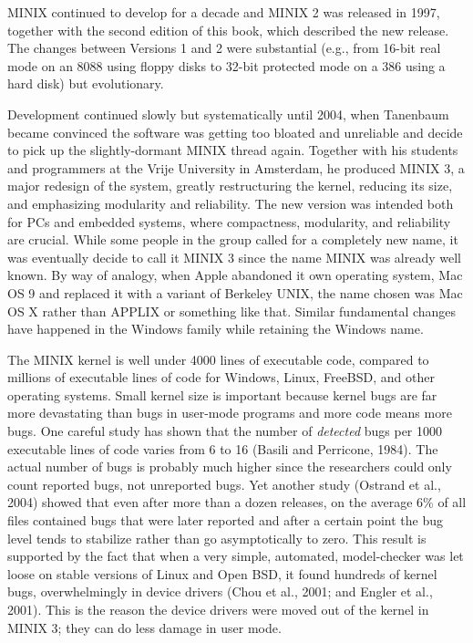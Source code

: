 \documentclass{book}
\newcommand {\sys} [1] {\textsl{#1}}
\begin{document}
MINIX continued to develop for a decade and MINIX 2 was released in 1997, 
together with the second edition of this book, which described the new release.
The changes between Versions 1 and 2 were substantial (e.g., from 16-bit real mode on an 8088 using floppy disks 
to 32-bit protected mode on a 386 using a hard disk) but evolutionary.

Development continued slowly but systematically until 2004, when Tanenbaum became convinced the software was getting too bloated and unreliable
and decide to pick up the slightly-dormant MINIX thread again.
Together with his students and programmers at the Vrije University in Amsterdam, he produced MINIX 3,
a major redesign of the system, greatly restructuring the kernel, reducing its size, and emphasizing modularity and reliability.
The new version was intended both for PCs and embedded systems, where compactness, modularity, and reliability are crucial.
While some people in the group called for a completely new name, it was eventually decide to call it MINIX 3 
since the name MINIX was already well known.
By way of analogy, when Apple abandoned it own operating system, Mac OS 9 and replaced it with a variant of Berkeley UNIX, 
the name chosen was Mac OS X rather than APPLIX or something like that.
Similar fundamental changes have happened in the Windows family while retaining the Windows name.

The MINIX kernel is well under 4000 lines of executable code, compared to millions of executable lines of code for Windows, Linux, FreeBSD, and other operating systems.
Small kernel size is important because kernel bugs are far more devastating than bugs in user-mode programs and more code means more bugs.
One careful study has shown that the number of \sys{detected} bugs per 1000 executable lines of code varies from 6 to 16 (Basili and Perricone, 1984).
The actual number of bugs is probably much higher since the researchers could only count reported bugs, not unreported bugs.
Yet another study (Ostrand et al., 2004) showed that even after more than a dozen releases, on the average 6\% of all files contained bugs 
that were later reported and after a certain point the bug level tends to stabilize rather than go asymptotically to zero.
This result is supported by the fact that when a very simple, automated, model-checker was let loose on stable versions of Linux and Open BSD, 
it found hundreds of kernel bugs, overwhelmingly in device drivers (Chou et al., 2001; and Engler et al., 2001).
This is the reason the device drivers were moved out of the kernel in MINIX 3; they can do less damage in user mode.
\end{document}
